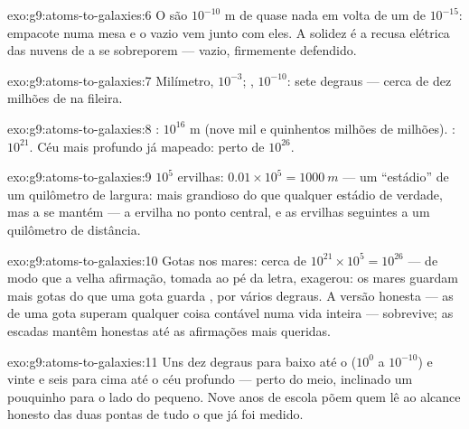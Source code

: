 \begin{solution}{exo:g9:atoms-to-galaxies:6}
O  são $10^{-10}$ \unit{m} de quase nada em volta de um 
de $10^{-15}$: empacote  numa mesa e o vazio vem junto com
eles. A solidez é a recusa elétrica das nuvens de  a se
sobreporem --- vazio, firmemente defendido.
\end{solution}

\begin{solution}{exo:g9:atoms-to-galaxies:7}
Milímetro, $10^{-3}$; , $10^{-10}$: sete degraus --- cerca de
dez milhões de  na fileira.
\end{solution}

\begin{solution}{exo:g9:atoms-to-galaxies:8}
: $10^{16}$ \unit{m} (nove mil e quinhentos milhões de
milhões). : $10^{21}$. Céu mais profundo já mapeado: perto
de $10^{26}$.
\end{solution}

\begin{solution}{exo:g9:atoms-to-galaxies:9}
$10^{5}$ ervilhas: $0.01 \times 10^{5} = \qty{1000}{m}$ --- um
``estádio'' de um quilômetro de largura: mais grandioso do que
qualquer estádio de verdade, mas a  se mantém --- a ervilha no
ponto central, e as ervilhas seguintes a um quilômetro de distância.
\end{solution}

\begin{solution}{exo:g9:atoms-to-galaxies:10}
Gotas nos mares: cerca de $10^{21} \times 10^{5} = 10^{26}$ --- de
modo que a velha afirmação, tomada ao pé da letra, exagerou: os mares
guardam mais gotas do que uma gota guarda , por vários
degraus. A versão honesta --- as  de uma gota superam
qualquer coisa contável numa vida inteira --- sobrevive; as escadas
mantêm honestas até as afirmações mais queridas.
\end{solution}

\begin{solution}{exo:g9:atoms-to-galaxies:11}
Uns dez degraus para baixo até o  ($10^{0}$ a $10^{-10}$) e
vinte e seis para cima até o céu profundo --- perto do meio,
inclinado um pouquinho para o lado do pequeno. Nove anos de escola
põem quem lê ao alcance honesto das duas pontas de tudo o que já foi
medido.
\end{solution}

